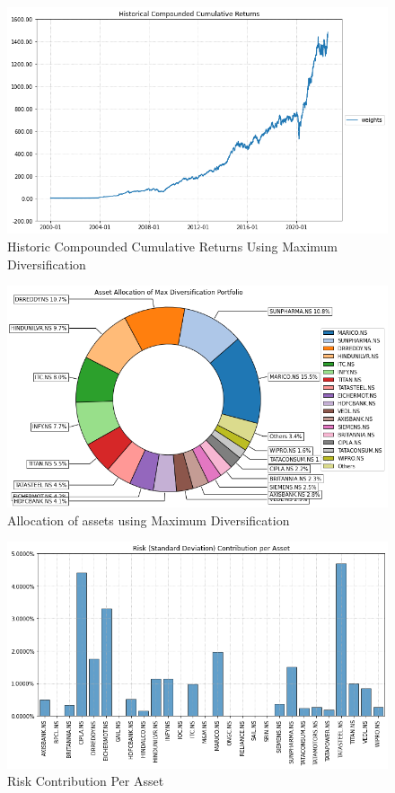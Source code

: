 \begin{figure}[H]
\centering
   \includegraphics[width=1.0\textwidth]{MD/Historic.png}
      \caption{Historic Compounded Cumulative Returns Using Maximum Diversification}
       \label{MD_HCCR}
\end{figure}

\begin{figure}[H]
\centering
   \includegraphics[width=1.0\textwidth]{MD/Allocation.png}
      \caption{Allocation of assets using Maximum Diversification}
       \label{MD_Alloc}
\end{figure}

\begin{figure}[H]
\centering
   \includegraphics[width=1.0\textwidth]{MD/Risk.png}
      \caption{Risk Contribution Per Asset}
       \label{MD_Risk}
\end{figure}

